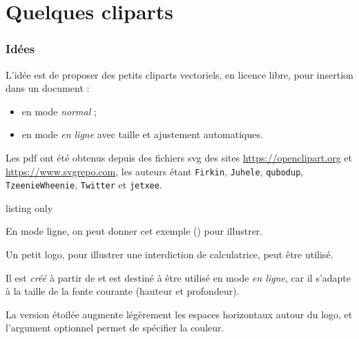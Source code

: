 \part{Quelques cliparts}

\section{Idées}\label{cliparts}

\begin{tipblock}
 L'idée est de proposer des petits cliparts vectoriels, en licence libre, pour insertion dans un document :

\begin{itemize}
	\item en mode \textit{normal} ;
	\item en mode \textit{en ligne} avec taille et ajustement automatiques.
\end{itemize}
\vspace*{-\baselineskip}\leavevmode
\end{tipblock}

\begin{importantblock}
Les \textsf{pdf} ont été obtenus depuis des fichiers \textsf{svg} des sites \url{https://openclipart.org} et \url{https://www.svgrepo.com}, les auteurs étant \texttt{Firkin}, \texttt{Juhele}, \texttt{qubodup}, \texttt{TzeenieWheenie}, \texttt{Twitter} et \texttt{jetxee}.
\end{importantblock}

\begin{PresCodeTexPL}{listing only}

\end{PresCodeTexPL}

\begin{PresCodePL}{}

En mode ligne, on peut donner cet exemple () pour illustrer.
\end{PresCodePL}

\begin{tipblock}
 Un petit logo, pour illustrer une interdiction de calculatrice, peut être utilisé.

Il est \textit{créé} à partir de  et est destiné à être utilisé en mode \textit{en ligne}, car il s'adapte à la taille de la fonte courante (hauteur et profondeur).

\smallskip

La version étoilée augmente légèrement les espaces horizontaux autour du logo, et l'argument optionnel permet de spécifier la couleur.
\end{tipblock}

